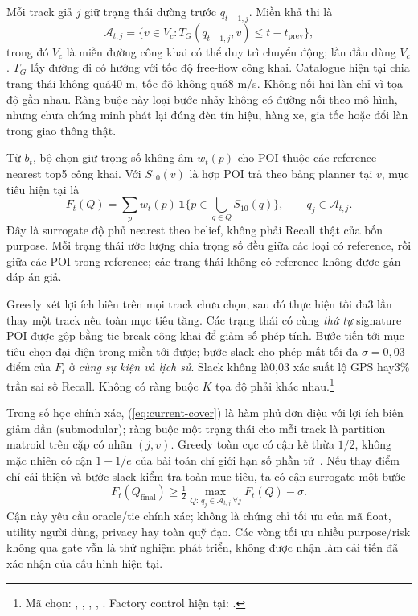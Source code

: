 Mỗi track giả $j$ giữ trạng thái đường trước $q_{t-1,j}$. Miền khả thi là
\begin{equation}
 \mathcal A_{t,j}=\{v\in V_c:T_G(q_{t-1,j},v)\leq t-t_{\mathrm{prev}}\},
 \label{eq:current-feasible}
\end{equation}
trong đó $V_c$ là miền đường công khai có thể duy trì chuyển động; lần đầu dùng $V_c$. $T_G$ lấy đường đi có hướng với tốc độ free-flow công khai. Catalogue hiện tại chia trạng thái không quá40 m, tốc độ không quá8 m/s. Không nối hai làn chỉ vì tọa độ gần nhau. Ràng buộc này loại bước nhảy không có đường nối theo mô hình, nhưng chưa chứng minh phát lại đúng đèn tín hiệu, hàng xe, gia tốc hoặc đổi làn trong giao thông thật.

Từ $b_t$, bộ chọn giữ trọng số không âm $w_t(p)$ cho POI thuộc các reference nearest top5 công khai. Với $S_{10}(v)$ là hợp POI trả theo bảng planner tại $v$, mục tiêu hiện tại là
\begin{equation}
 F_t(Q)=\sum_p w_t(p)\,\mathbf1\{p\in\bigcup_{q\in Q}S_{10}(q)\},
 \qquad q_j\in\mathcal A_{t,j}.
 \label{eq:current-cover}
\end{equation}
Đây là surrogate độ phủ nearest theo belief, không phải Recall thật của bốn purpose. Mỗi trạng thái ước lượng chia trọng số đều giữa các loại có reference, rồi giữa các POI trong reference; các trạng thái không có reference không được gán đáp án giả.

Greedy xét lợi ích biên trên mọi track chưa chọn, sau đó thực hiện tối đa3 lần thay một track nếu toàn mục tiêu tăng. Các trạng thái có cùng \emph{thứ tự} signature POI được gộp bằng tie-break công khai để giảm số phép tính. Bước tiến tới mục tiêu chọn đại diện trong miền tới được; bước slack cho phép mất tối đa $\sigma=0{,}03$ điểm của $F_t$ ở \emph{cùng sự kiện và lịch sử}. Slack không là0,03 xác suất lộ GPS hay3\% trần sai số Recall. Không có ràng buộc $K$ tọa độ phải khác nhau.\footnote{Mã chọn: , , , , . Factory control hiện tại: .}

Trong số học chính xác, (\ref{eq:current-cover}) là hàm phủ đơn điệu với lợi ích biên giảm dần (submodular); ràng buộc một trạng thái cho mỗi track là partition matroid trên cặp có nhãn $(j,v)$. Greedy toàn cục có cận kế thừa $1/2$, không mặc nhiên có cận $1-1/e$ của bài toán chỉ giới hạn số phần tử~\cite{calinescu2011matroid}. Nếu thay điểm chỉ cải thiện và bước slack kiểm tra toàn mục tiêu, ta có cận surrogate một bước
\[
 F_t(Q_{\mathrm{final}})\geq\tfrac12\max_{Q:\,q_j\in\mathcal A_{t,j}\ \forall j}F_t(Q)-\sigma.
\]
Cận này yêu cầu oracle/tie chính xác; không là chứng chỉ tối ưu của mã float, utility người dùng, privacy hay toàn quỹ đạo. Các vòng tối ưu nhiều purpose/risk không qua gate vẫn là thử nghiệm phát triển, không được nhận làm cải tiến đã xác nhận của cấu hình hiện tại.

